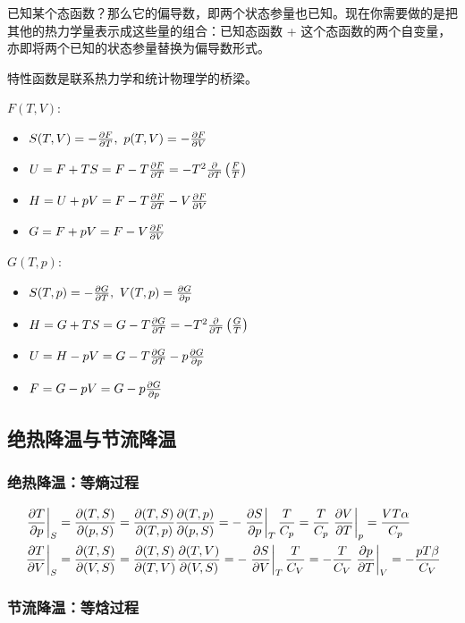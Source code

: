 已知某个态函数？那么它的偏导数，即两个状态参量也已知。现在你需要做的是把其他的热力学量表示成这些量的组合：已知态函数 + 这个态函数的两个自变量，亦即将两个已知的状态参量替换为偏导数形式。

特性函数是联系热力学和统计物理学的桥梁。

$F(T, V)$:
\begin{itemize}
    \item $S(T, V) = -\pdv{F}{T},\ p(T, V) = - \pdv{F}{V}$
    \item $U = F + T S = F - T \pdv{F}{T} = - T^2 \pdv{}{T} \left(\frac{F}{T}\right)$
    \item $H = U + p V = F - T \pdv{F}{T} - V \pdv{F}{V}$
    \item $G = F + p V = F - V \pdv{F}{V}$
\end{itemize}

$G(T, p)$:
\begin{itemize}
    \item $S(T, p) = - \pdv{G}{T},\ V(T, p) = \pdv{G}{p}$
    \item $H = G + T S = G - T \pdv{G}{T} = - T^2 \pdv{}{T} \left(\frac{G}{T}\right)$
    \item $U = H - p V = G - T \pdv{G}{T} - p \pdv{G}{p}$
    \item $F = G - p V = G - p \pdv{G}{p}$
\end{itemize}

\subsection{绝热降温与节流降温}

\subsubsection{绝热降温：等熵过程}

\begin{align*}
    \left.\pdv{T}{p}\right|_S & = \pdv{(T, S)}{(p, S)} = \pdv{(T, S)}{(T, p)} \pdv{(T, p)}{(p, S)} = -\left.\pdv{S}{p}\right|_T \frac{T}{C_p} = \frac{T}{C_p} \left.\pdv{V}{T}\right|_p = \frac{V T \alpha}{C_p}\\
    \left.\pdv{T}{V}\right|_S & = \pdv{(T, S)}{(V, S)} = \pdv{(T, S)}{(T, V)} \pdv{(T, V)}{(V, S)} = - \left.\pdv{S}{V}\right|_T \frac{T}{C_V} = - \frac{T}{C_V} \left.\pdv{p}{T}\right|_V = - \frac{p T \beta}{C_V}
\end{align*}

\subsubsection{节流降温：等焓过程}

